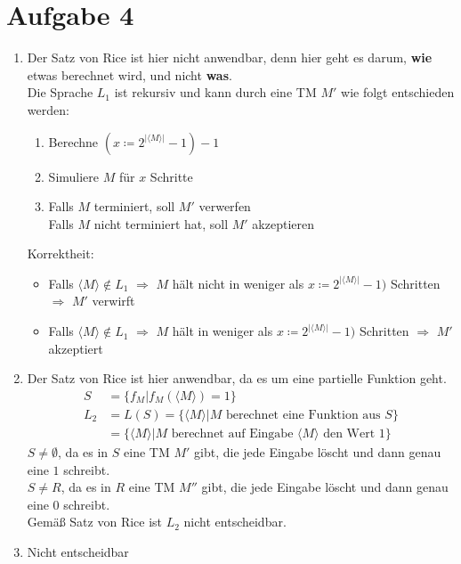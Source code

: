 \documentclass[a4paper,11pt]{scrartcl}
\begin{document}
	\section*{Aufgabe 4}
	\begin{enumerate}[label=(\alph*)]
	\item	Der Satz von Rice ist hier nicht anwendbar, denn hier geht es darum, \textbf{wie} etwas berechnet wird, und nicht \textbf{was}.\\
			Die Sprache $L_1$ ist rekursiv und kann durch eine TM $M'$ wie folgt entschieden werden:
			\begin{enumerate}[label=\arabic*)]
			\item Berechne $(x \coloneqq 2^{\vert \langle M \rangle \vert} - 1) - 1$
			\item Simuliere $M$ für $x$ Schritte
			\item Falls $M$ terminiert, soll $M'$ verwerfen\\
				  Falls $M$ nicht terminiert hat, soll $M'$ akzeptieren
			\end{enumerate}
			Korrektheit:
			\begin{itemize}
			\item Falls $\langle M \rangle \not\in L_1$ $\Rightarrow$ $M$ hält nicht in weniger als $x \coloneqq 2^{\vert \langle M \rangle \vert} - 1)$ Schritten $\Rightarrow$ $M'$ verwirft
			\item Falls $\langle M \rangle \not\in L_1$ $\Rightarrow$ $M$ hält in weniger als $x \coloneqq 2^{\vert \langle M \rangle \vert} - 1)$ Schritten $\Rightarrow$ $M'$ akzeptiert
			\end{itemize}
	
	\item	Der Satz von Rice ist hier anwendbar, da es um eine partielle Funktion geht.\\
			\begin{align*}
			S &=\{f_M \vert f_M(\langle M \rangle) = 1\}\\
			L_2 &= L(S) = \{\langle M \rangle \vert M \text{ berechnet eine Funktion aus } S\}\\
				&= \{\langle M \rangle \vert M \text{ berechnet auf Eingabe } \langle M \rangle \text{ den Wert } 1 \}
			\end{align*}
			$S \neq \emptyset$, da es in $S$ eine TM $M'$ gibt, die jede Eingabe löscht und dann genau eine $1$ schreibt.\\
			$S \neq R$, da es in $R$ eine TM $M''$ gibt, die jede Eingabe löscht und dann genau eine $0$ schreibt.\\
			Gemäß Satz von Rice ist $L_2$ nicht entscheidbar.
	
	\item	Nicht entscheidbar
	
	\end{enumerate}
	
\end{document}
